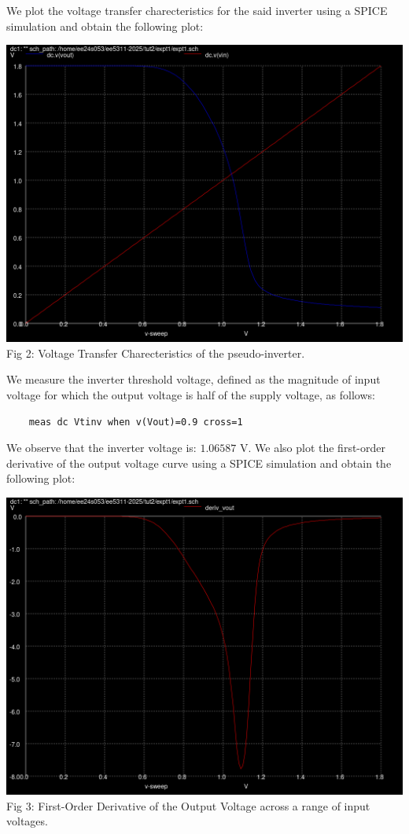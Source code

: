 \documentclass[12pt,a4paper]{article}
\begin{document}
\noindent We plot the voltage transfer charecteristics for the said inverter using a SPICE simulation and obtain the following plot:

\begin{center}
\includegraphics[scale=0.3]{tut2/reports/media/expt1_vtc.png} \\ Fig 2: Voltage Transfer Charecteristics of the pseudo-inverter.
\end{center}

\noindent We measure the inverter threshold voltage, defined as the magnitude of input voltage for which the output voltage is half of the supply voltage, as follows:

\begin{verbatim}
    meas dc Vtinv when v(Vout)=0.9 cross=1
\end{verbatim}

\noindent We observe that the inverter voltage is: $1.06587$ V.\newline
We also plot the first-order derivative of the output voltage curve using a SPICE simulation and obtain the following plot:

\begin{center}
\includegraphics[scale=0.3]{tut2/reports/media/expt1_deriv_vout.png} \\ Fig 3: First-Order Derivative of the Output Voltage across a range of input voltages.
\end{center}
\end{document}
